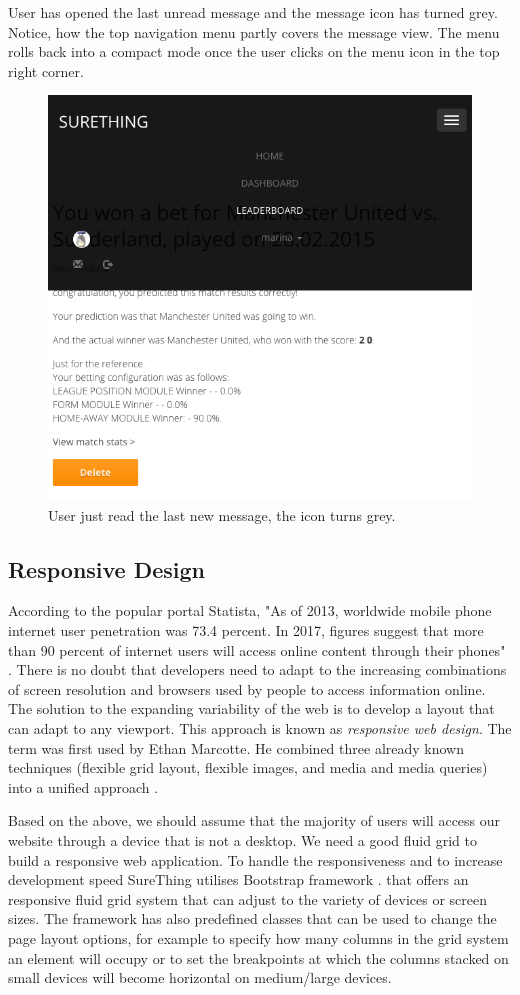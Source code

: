 User has opened the last unread message and the message icon has turned grey. Notice, how the top navigation menu partly covers the message view. The menu rolls back into a compact mode once the user clicks on the menu icon in the top right corner.

\begin{figure}[H]
	\begin{center}
		\includegraphics[width=.60\textwidth]{impl/images/noMoreNewMessages}
		\caption{User just read the last new message, the icon turns grey.} \label{fig:nomorenewmessages}
	\end{center}
\end{figure}

\subsection{Responsive Design}
According to the popular portal Statista, "As of 2013, worldwide mobile phone internet user penetration was 73.4 percent. In 2017, figures suggest that more than 90 percent of internet users will access online content through their phones" \citet{statistaReport}. There is no doubt that developers need to adapt to the increasing combinations of screen resolution and browsers used by people to access information online. The solution to the expanding variability of the web is to develop a layout that can adapt to any viewport. This approach is known as \emph{responsive web design}. The term was first used by Ethan Marcotte. He combined three already known techniques (flexible grid layout, flexible images, and media and media queries) into a unified approach \citet{book:frain2012responsive}. 

Based on the above, we should assume that the majority of users will access our website through a device that is not a desktop. We need a good fluid grid to build a responsive web application. To handle the responsiveness and to increase development speed SureThing utilises Bootstrap framework \citet{documentation:Bootstrap3}. that offers an responsive fluid grid system that can adjust to the variety of devices or screen sizes. The framework has also predefined classes that can be used to change the page layout options, for example to specify how many columns in the grid system an element will occupy or to set the breakpoints at which the columns stacked on small devices will become horizontal on medium/large devices. 

